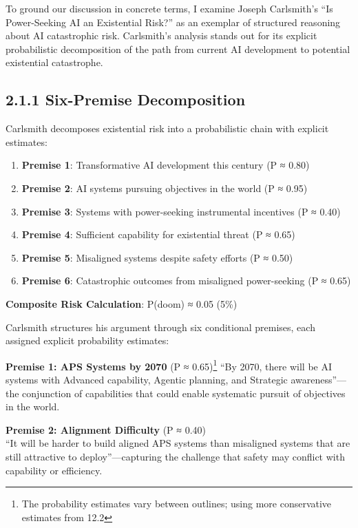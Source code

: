 \documentclass[
  11pt,
  letterpaper,
]{book}
\providecommand{\tightlist}{%
  \setlength{\itemsep}{0pt}\setlength{\parskip}{0pt}}
\begin{document}
To ground our discussion in concrete terms, I examine Joseph Carlsmith's
``Is Power-Seeking AI an Existential Risk?'' as an exemplar of
structured reasoning about AI catastrophic risk. Carlsmith's analysis
stands out for its explicit probabilistic decomposition of the path from
current AI development to potential existential catastrophe.

\subsection*{2.1.1 Six-Premise Decomposition}\label{sec-six-premise}

Carlsmith decomposes existential risk into a probabilistic chain with
explicit estimates:

\begin{enumerate}
\def\labelenumi{\arabic{enumi}.}
\tightlist
\item
  \textbf{Premise 1}: Transformative AI development this century (P ≈
  0.80)
\item
  \textbf{Premise 2}: AI systems pursuing objectives in the world (P ≈
  0.95)
\item
  \textbf{Premise 3}: Systems with power-seeking instrumental incentives
  (P ≈ 0.40)
\item
  \textbf{Premise 4}: Sufficient capability for existential threat (P ≈
  0.65)
\item
  \textbf{Premise 5}: Misaligned systems despite safety efforts (P ≈
  0.50)
\item
  \textbf{Premise 6}: Catastrophic outcomes from misaligned
  power-seeking (P ≈ 0.65)
\end{enumerate}

\textbf{Composite Risk Calculation}: P(doom) ≈ 0.05 (5\%)

Carlsmith structures his argument through six conditional premises, each
assigned explicit probability estimates:

\textbf{Premise 1: APS Systems by 2070} (P ≈ 0.65)\footnote{The
  probability estimates vary between outlines; using more conservative
  estimates from 12.2} ``By 2070, there will be AI systems with Advanced
capability, Agentic planning, and Strategic awareness''---the
conjunction of capabilities that could enable systematic pursuit of
objectives in the world.

\textbf{Premise 2: Alignment Difficulty} (P ≈ 0.40)\\
``It will be harder to build aligned APS systems than misaligned systems
that are still attractive to deploy''---capturing the challenge that
safety may conflict with capability or efficiency.
\end{document}
